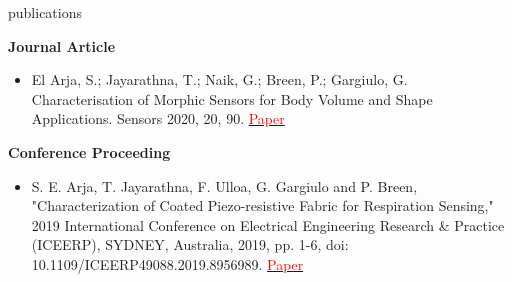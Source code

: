 \documentclass{resume} %
\begin{document}
\begin{rSection}{publications}

\textbf{Journal Article}\\
\begin{itemize}
    \item El Arja, S.; Jayarathna, T.; Naik, G.; Breen, P.; Gargiulo, G. Characterisation of Morphic Sensors for Body Volume and Shape Applications. Sensors 2020, 20, 90. \href{https://www.mdpi.com/1424-8220/20/1/90}{\textcolor{red}{Paper}}
\end{itemize}

\textbf{Conference Proceeding}\\
\begin{itemize}
    \item S. E. Arja, T. Jayarathna, F. Ulloa, G. Gargiulo and P. Breen, "Characterization of Coated Piezo-resistive Fabric for Respiration Sensing," 2019 International Conference on Electrical Engineering Research & Practice (ICEERP), SYDNEY, Australia, 2019, pp. 1-6, doi: 10.1109/ICEERP49088.2019.8956989. \href{https://ieeexplore.ieee.org/abstract/document/8956989}{\textcolor{red}{Paper}}
\end{itemize}
\end{rSection}
\end{document}
